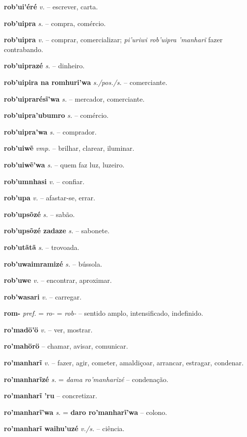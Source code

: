 \textbf{rob'ui'éré} \textit{v.} -- escrever, carta.

\textbf{rob'uipra} \textit{s.} -- compra, comércio.

\textbf{rob'uipra} \textit{v.} -- comprar, comercializar; \textit{pi'uriwi rob'uipra 'manharĩ} fazer contrabando.

\textbf{rob'uiprazé} \textit{s.} -- dinheiro.

\textbf{rob'uipira na romhuri'wa} \textit{s./pos./s.} -- comerciante.

\textbf{rob'uiprarésĩ'wa} \textit{s.} -- mercador, comerciante.

\textbf{rob'uipra'ubumro} \textit{s.} -- comércio.

\textbf{rob'uipra'wa} \textit{s.} -- comprador.

\textbf{rob'uiwẽ} \textit{vmp.} -- brilhar, clarear, iluminar.

\textbf{rob'uiwẽ'wa} \textit{s.} -- quem faz luz, luzeiro.

\textbf{rob'umnhasi} \textit{v.} -- confiar.

\textbf{rob'upa} \textit{v.} -- afastar-se, errar.

\textbf{rob'upsõzé} \textit{s.} -- sabão.

\textbf{rob'upsõzé zadaze} \textit{s.} -- sabonete.

\textbf{rob'utãtã} \textit{s.} -- trovoada.

\textbf{rob'uwaimramizé} \textit{s.} -- bússola.

\textbf{rob'uwe} \textit{v.} -- encontrar, aproximar.

\textbf{rob'wasari} \textit{v.} -- carregar.

\textbf{rom-} \textit{pref.} = \textit{ro-} = \textit{rob-} -- sentido amplo, intensificado, indefinido.

\textbf{ro'madö'ö} \textit{v.} -- ver, mostrar.

\textbf{ro'mahörö} \textit{} -- chamar, avisar, comunicar.

\textbf{ro'manharĩ} \textit{v.} -- fazer, agir, cometer, amaldiçoar, arrancar, estragar, condenar.

\textbf{ro'manharĩzé} \textit{s.} = \textit{dama ro'manharĩzé} -- condenação.

\textbf{ro'manharĩ 'ru} \textit{} -- concretizar.

\textbf{ro'manharĩ'wa} \textit{s.} = \textbf{daro ro'manharĩ'wa} -- colono.

\textbf{ro'manharĩ waihu'uzé} \textit{v./s.} -- ciência.

